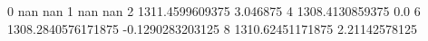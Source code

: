 0 nan nan
1 nan nan
2 1311.4599609375 3.046875
4 1308.4130859375 0.0
6 1308.2840576171875 -0.1290283203125
8 1310.62451171875 2.21142578125
